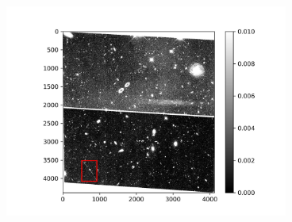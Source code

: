 \documentclass[12pt,a4paper]{article}%
\begin{document}
\begin{figure}[H]%
    \centering
    \begin{minipage}{0.48\textwidth}
        \centering
        \includegraphics[width=0.83\textwidth]{fig71.jpg}


\end{minipage}
\end{figure}
\end{document}
